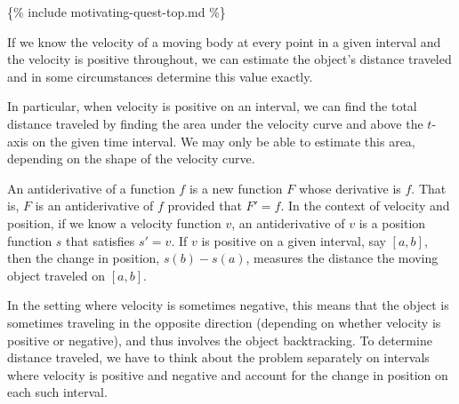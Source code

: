 \{\% include motivating-quest-top.md \%\}
\begin{summary}
\item If we know the velocity of a moving body at every point in a given interval and the velocity is positive throughout, we can estimate the object's distance traveled and in some circumstances determine this value exactly.
\item In particular, when velocity is positive on an interval, we can find the total distance traveled by finding the area under the velocity curve and above the $t$-axis on the given time interval.  We may only be able to estimate this area, depending on the shape of the velocity curve.
\item An antiderivative of a function $f$ is a new function $F$ whose derivative is $f$.  That is, $F$ is an antiderivative of $f$ provided that $F' = f$.  In the context of velocity and position, if we know a velocity function $v$, an antiderivative of $v$ is a position function $s$ that satisfies $s' = v$.  If $v$ is positive on a given interval, say $[a,b]$, then the change in position, $s(b) - s(a)$, measures the distance the moving object traveled on $[a,b]$.
\item In the setting where velocity is sometimes negative, this means that the object is sometimes traveling in the opposite direction (depending on whether velocity is positive or negative), and thus involves the object backtracking.  To determine distance traveled, we have to think about the problem separately on intervals where velocity is positive and negative and account for the change in position on each such interval.
\end{summary}

\nin \hrulefill

\newpage

